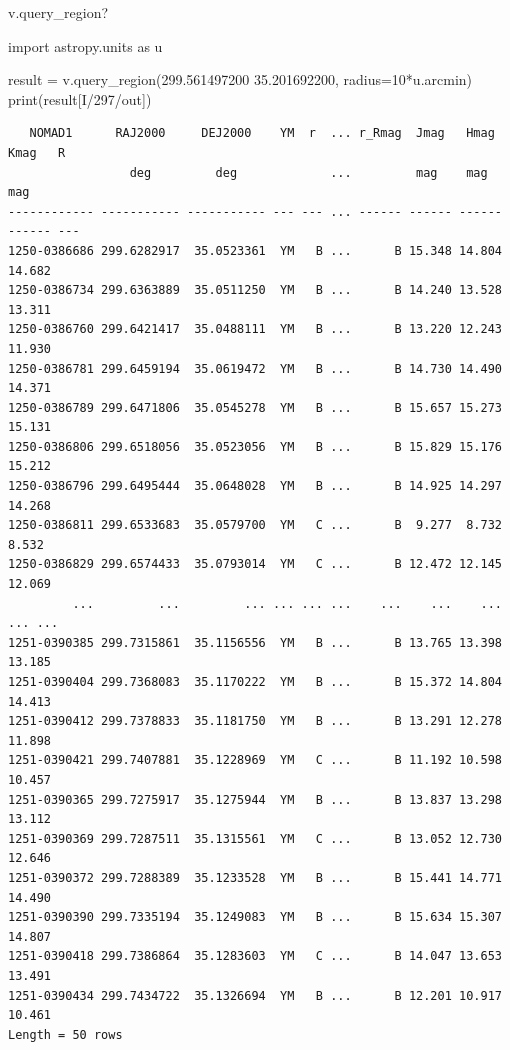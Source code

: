\documentclass[
  letterpaper,
  DIV=11,
  numbers=noendperiod]{scrreprt}
\newenvironment{Shaded}{\begin{snugshade}}{\end{snugshade}}
\newcommand{\BuiltInTok}[1]{\textcolor[rgb]{0.00,0.23,0.31}{#1}}
\newcommand{\DecValTok}[1]{\textcolor[rgb]{0.68,0.00,0.00}{#1}}
\newcommand{\ImportTok}[1]{\textcolor[rgb]{0.00,0.46,0.62}{#1}}
\newcommand{\NormalTok}[1]{\textcolor[rgb]{0.00,0.23,0.31}{#1}}
\newcommand{\OperatorTok}[1]{\textcolor[rgb]{0.37,0.37,0.37}{#1}}
\newcommand{\StringTok}[1]{\textcolor[rgb]{0.13,0.47,0.30}{#1}}
\begin{document}
\begin{Shaded}
\begin{Highlighting}[]
\NormalTok{v.query\_region?}
\end{Highlighting}
\end{Shaded}

\begin{Shaded}
\begin{Highlighting}[]
\ImportTok{import}\NormalTok{ astropy.units }\ImportTok{as}\NormalTok{ u}

\NormalTok{result }\OperatorTok{=}\NormalTok{ v.query\_region(}\StringTok{\textquotesingle{}299.561497200  35.201692200\textquotesingle{}}\NormalTok{, radius}\OperatorTok{=}\DecValTok{10}\OperatorTok{*}\NormalTok{u.arcmin)}
\BuiltInTok{print}\NormalTok{(result[}\StringTok{\textquotesingle{}I/297/out\textquotesingle{}}\NormalTok{])}
\end{Highlighting}
\end{Shaded}

\begin{verbatim}
   NOMAD1      RAJ2000     DEJ2000    YM  r  ... r_Rmag  Jmag   Hmag   Kmag   R 
                 deg         deg             ...         mag    mag    mag      
------------ ----------- ----------- --- --- ... ------ ------ ------ ------ ---
1250-0386686 299.6282917  35.0523361  YM   B ...      B 15.348 14.804 14.682    
1250-0386734 299.6363889  35.0511250  YM   B ...      B 14.240 13.528 13.311    
1250-0386760 299.6421417  35.0488111  YM   B ...      B 13.220 12.243 11.930    
1250-0386781 299.6459194  35.0619472  YM   B ...      B 14.730 14.490 14.371    
1250-0386789 299.6471806  35.0545278  YM   B ...      B 15.657 15.273 15.131    
1250-0386806 299.6518056  35.0523056  YM   B ...      B 15.829 15.176 15.212    
1250-0386796 299.6495444  35.0648028  YM   B ...      B 14.925 14.297 14.268    
1250-0386811 299.6533683  35.0579700  YM   C ...      B  9.277  8.732  8.532    
1250-0386829 299.6574433  35.0793014  YM   C ...      B 12.472 12.145 12.069    
         ...         ...         ... ... ... ...    ...    ...    ...    ... ...
1251-0390385 299.7315861  35.1156556  YM   B ...      B 13.765 13.398 13.185    
1251-0390404 299.7368083  35.1170222  YM   B ...      B 15.372 14.804 14.413    
1251-0390412 299.7378833  35.1181750  YM   B ...      B 13.291 12.278 11.898    
1251-0390421 299.7407881  35.1228969  YM   C ...      B 11.192 10.598 10.457    
1251-0390365 299.7275917  35.1275944  YM   B ...      B 13.837 13.298 13.112    
1251-0390369 299.7287511  35.1315561  YM   C ...      B 13.052 12.730 12.646    
1251-0390372 299.7288389  35.1233528  YM   B ...      B 15.441 14.771 14.490    
1251-0390390 299.7335194  35.1249083  YM   B ...      B 15.634 15.307 14.807    
1251-0390418 299.7386864  35.1283603  YM   C ...      B 14.047 13.653 13.491    
1251-0390434 299.7434722  35.1326694  YM   B ...      B 12.201 10.917 10.461    
Length = 50 rows
\end{verbatim}
\end{document}
